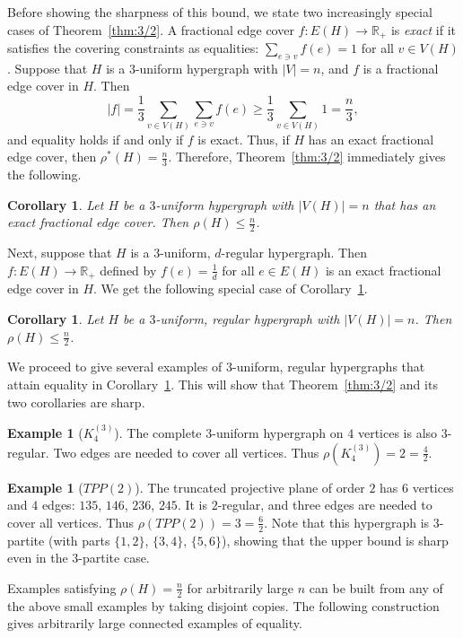 \documentclass{article}
\newtheorem{corollary}[theorem]{Corollary}
\theoremstyle{definition}
\newtheorem{example}[theorem]{Example}
\begin{document}
Before showing the sharpness of this bound, we state two increasingly special cases of Theorem~\ref{thm:3/2}. A fractional edge cover $f: E(H) \to \mathbb{R}_+$ is \emph{exact} if it satisfies the covering constraints as equalities: $\sum_{e \ni v} f(e) = 1$ for all $v \in V(H)$. Suppose that $H$ is a $3$-uniform hypergraph with $|V|=n$, and $f$ is a fractional edge cover in $H$. Then \[ |f| = \frac{1}{3} \sum_{v \in V(H)} \sum_{e \ni v} f(e) \ge \frac{1}{3} \sum_{v \in V(H)} 1 = \frac{n}{3},\] and equality holds if and only if $f$ is exact. Thus, if $H$ has an exact fractional edge cover, then $\rho^*(H) = \frac{n}{3}$. Therefore, Theorem~\ref{thm:3/2} immediately gives the following.
\begin{corollary} \label{cor:Ex}
Let $H$ be a $3$-uniform hypergraph with $|V(H)|=n$ that has an exact fractional edge cover. Then $\rho(H) \le \frac{n}{2}$.
\end{corollary}
Next, suppose that $H$ is a $3$-uniform, $d$-regular hypergraph. Then $f: E(H) \to \mathbb{R}_+$ defined by $f(e) = \frac{1}{d}$ for all $e \in E(H)$ is an exact fractional edge cover in $H$. We get the following special case of Corollary~\ref{cor:Ex}.
\begin{corollary} \label{cor:Reg}
Let $H$ be a $3$-uniform, regular hypergraph with $|V(H)|=n$. Then $\rho(H) \le \frac{n}{2}$.
\end{corollary}
We proceed to give several examples of $3$-uniform, regular hypergraphs that attain equality in Corollary~\ref{cor:Reg}. This will show that Theorem~\ref{thm:3/2} and its two corollaries are sharp.
\begin{example}[$K^{(3)}_4$] \label{ex:1}
The complete $3$-uniform hypergraph on $4$ vertices is also $3$-regular. Two edges are needed to cover all vertices. Thus $\rho(K^{(3)}_4) = 2 = \frac{4}{2}$.
\end{example}
\begin{example}[$TPP(2)$] \label{ex:2}
The truncated projective plane of order $2$ has $6$ vertices and $4$ edges: $135$, $146$, $236$, $245$. It is $2$-regular, and three edges are needed to cover all vertices. Thus $\rho(TPP(2)) = 3 = \frac{6}{2}$. Note that this hypergraph is $3$-partite (with parts $\{1,2\}$, $\{3,4\}$, $\{5,6\}$), showing that the upper bound is sharp even in the $3$-partite case.
\end{example}
Examples satisfying $\rho(H) = \frac{n}{2}$ for arbitrarily large $n$ can be built from any of the above small examples by taking disjoint copies. The following construction gives arbitrarily large connected examples of equality.
\end{document}
